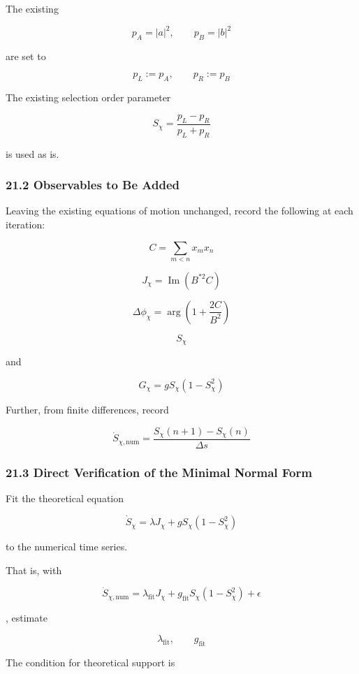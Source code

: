 \documentclass[
  a4paper,
]{article}
\begin{document}
The existing

\[
p_A=|a|^2,
\qquad
p_B=|b|^2
\]

are set to

\[
p_L:=p_A,
\qquad
p_R:=p_B
\]

The existing selection order parameter

\[
\boxed{
S_\chi
=
\frac{p_L-p_R}{p_L+p_R}
}
\tag{174}
\]

is used as is.

\subsubsection{21.2 Observables to Be
Added}\label{observables-to-be-added}

Leaving the existing equations of motion unchanged, record the following
at each iteration:

\[
C
=
\sum_{m<n}x_mx_n
\tag{175}
\]

\[
\boxed{
J_\chi
=
\operatorname{Im}
\left(
B^{*2}C
\right)
}
\tag{176}
\]

\[
\boxed{
\Delta\phi_\chi
=
\arg
\left(
1+\frac{2C}{B^2}
\right)
}
\tag{177}
\]

\[
S_\chi
\]

and

\[
\boxed{
G_\chi
=
gS_\chi
\left(
1-S_\chi^2
\right)
}
\tag{178}
\]

Further, from finite differences, record

\[
\boxed{
\dot S_{\chi,\mathrm{num}}
=
\frac{
S_\chi(n+1)-S_\chi(n)
}{
\Delta s
}
}
\tag{179}
\]

\subsubsection{21.3 Direct Verification of the Minimal Normal
Form}\label{direct-verification-of-the-minimal-normal-form}

Fit the theoretical equation

\[
\dot S_\chi
=
\lambda J_\chi
+
gS_\chi(1-S_\chi^2)
\]

to the numerical time series.

That is, with

\[
\boxed{
\dot S_{\chi,\mathrm{num}}
=
\lambda_{\mathrm{fit}}J_\chi
+
g_{\mathrm{fit}}
S_\chi(1-S_\chi^2)
+
\epsilon
}
\tag{180}
\]

, estimate

\[
\lambda_{\mathrm{fit}},
\qquad
g_{\mathrm{fit}}
\]

The condition for theoretical support is
\end{document}
